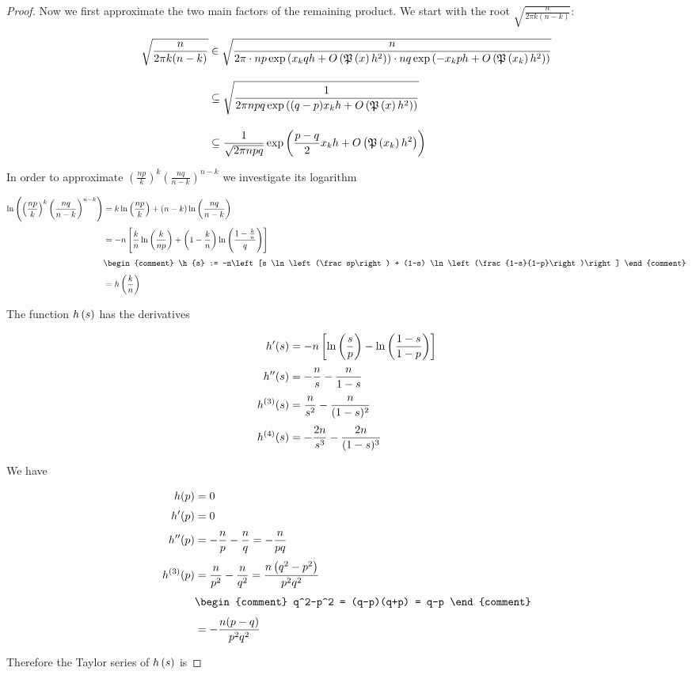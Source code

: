 \begin{proof}
  Now we first approximate the two main factors of the remaining product. We start with the root $\sqrt{\frac{n}{2\pi k(n-k)}}$:

  \begin{align}
    \sqrt{\frac{n}{2\pi k(n-k)}} & \in \sqrt{\frac{n}{2\pi \cdot np \fexp{\x qh +\bigo{\pol{x}h^2}} \cdot nq \fexp{-\x ph + \bigo{\pol{\x}h^2}}}} \bnl
    & \subseteq \sqrt{\frac{1}{2\pi npq \fexp{(q-p)\x h +\bigo{\pol{x}h^2}}}} \bnl
    & \subseteq \frac{1}{\sqrt{2\pi npq}} \fexp{\frac{p-q}2 \x h + \bigo{\pol{\x}h^2}}
  \end{align}

  \noindent In order to approximate $\left(\frac{np}{k}\right)^k \left(\frac{nq}{n-k}\right)^{n-k}$ we investigate its logarithm

  \begin{align}
    \ln\left(\left(\frac{np}{k}\right)^k \left(\frac{nq}{n-k}\right)^{n-k}\right) & = k \ln\left(\frac{np}{k}\right) + (n-k) \ln\left(\frac{nq}{n-k}\right) \nl
    &=-n \left[ \frac kn \ln\left(\frac{k}{np}\right) + \left(1-\frac kn\right) \ln\left(\frac{1-\frac kn}{q}\right)\right] \nl
    &
    \begin{comment}
      \h{s} := -n\left[s \ln\left(\frac sp\right) + (1-s) \ln\left(\frac{1-s}{1-p}\right)\right]
    \end{comment} \nl
    &= \h{\frac kn}
  \end{align}

  \noindent The function $h\left({s}\right)$ has the derivatives

  \begin{align}
    h'(s) &= -n\left[\ln\left(\frac sp\right) - \ln\left(\frac{1-s}{1-p}\right)\right] \nl
    h''(s) &= -\frac ns - \frac n{1-s} \nl
    h^{(3)}(s) &= \frac n{s^2} - \frac n{(1-s)^2} \nl
    h^{(4)}(s) &= -\frac {2n}{s^3} - \frac {2n}{(1-s)^3}
  \end{align}

  \noindent We have

  \begin{align}
    h(p)& = 0 \nl
    h'(p)& =0 \nl
    h''(p) & = -\frac np - \frac nq = -\frac n{pq} \nl
    h^{(3)}(p) &= \frac n{p^2}-\frac{n}{q^2} = \frac{n\left(q^2-p^2\right)}{p^2q^2} \nl
    &
    \begin{comment}
      q^2-p^2 = (q-p)(q+p) = q-p
    \end{comment} \nl
    &= -\frac{n(p-q)}{p^2q^2}
  \end{align}

  \noindent Therefore the Taylor series of $h\left({s}\right)$ is


\end{proof}
